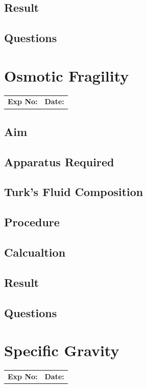 \documentclass[a4paper,12pt]{book}
\begin{document}
	\section*{Result}
	\section*{Questions}


\chapter*{\centering Osmotic Fragility}
		\begin{tabular}{p{5in} p{1in}}
			\textbf{Exp No:}  & \textbf{Date:}\\
		\end{tabular}

	\section*{Aim}
	\section*{Apparatus Required}
	\section*{Turk's Fluid Composition}
	\section*{Procedure}
	\section*{Calcualtion}
	\section*{Result}
	\section*{Questions}

\chapter*{\centering Specific Gravity}

		\begin{tabular}{p{5in} p{1in}}
			\textbf{Exp No:}  & \textbf{Date:}\\
		\end{tabular}
\end{document}

